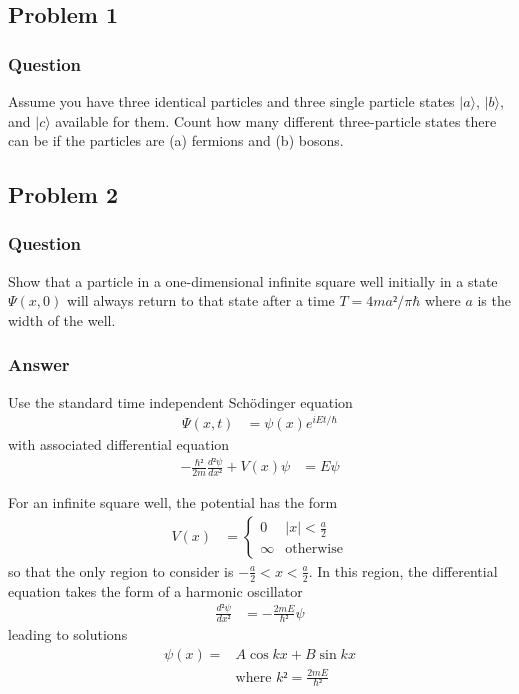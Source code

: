 \subsection{Problem 1}
\subsubsection{Question}
Assume you have three identical particles and three single particle states
$|a〉$, $|b〉$, and $|c〉$ available for them. Count how many different
three-particle states there can be if the particles are (a) fermions and (b)
bosons.

\clearpage
\subsection{Problem 2}
\subsubsection{Question}
Show that a particle in a one-dimensional infinite square well initially in a
state $Ψ(x,0)$ will always return to that state after a time $T = 4ma²/π\hbar$
where $a$ is the width of the well.

\subsubsection{Answer}
Use the standard time independent Schödinger equation
\begin{align*}
	Ψ(x,t) &= ψ(x) e^{iEt/\hbar}
\end{align*}
with associated differential equation
\begin{align*}
	-\frac{\hbar²}{2m} \frac{d²ψ}{dx²} + V(x)ψ &= Eψ
\end{align*}

For an infinite square well, the potential has the form
\begin{align*}
	V(x) &=
		\begin{cases}
			0	&	|x| < \frac{a}{2} \\
			∞	&	\text{otherwise}
		\end{cases}
\end{align*}
so that the only region to consider is $-\frac{a}{2} < x < \frac{a}{2}$. In this
region, the differential equation takes the form of a harmonic oscillator
\begin{align*}
	\frac{d²ψ}{dx²} &= -\frac{2mE}{\hbar²}ψ
\end{align*}
leading to solutions
\begin{align*}
	ψ(x) ={}& A\cos kx + B\sin kx \\
	{}& \text{where } k² = \frac{2mE}{\hbar²}
\end{align*}

